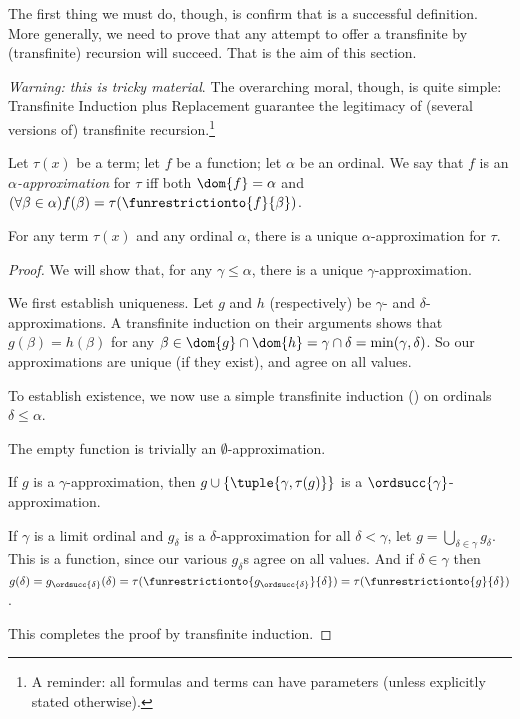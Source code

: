 \documentclass[../../../include/open-logic-section]{subfiles}
\begin{document}

The first thing we must do, though, is confirm that
 is a successful definition. More generally,
we need to prove that any attempt to offer a transfinite by
(transfinite) recursion will succeed. That is the aim of this section.

\emph{Warning: this is tricky material}. The overarching moral,
though, is quite simple: Transfinite Induction plus Replacement
guarantee the legitimacy of (several versions of) transfinite
recursion.\footnote{A reminder: all formulas and terms can have parameters (unless explicitly stated otherwise).}

\begin{defn}
	Let $\tau(x)$ be a term; let $f$ be a function; let $\alpha$ be an ordinal. We say that $f$ is an \emph{$\alpha$-approximation} for $\tau$ iff both $\dom{f} = \alpha$ and $(\forall \beta \in \alpha)f(\beta) = \tau(\funrestrictionto{f}{\beta})$.
\end{defn}

\begin{lem}
For any term $\tau(x)$ and any ordinal $\alpha$, there is a unique $\alpha$-approximation for $\tau$.
\end{lem}
\begin{proof}
We will show that, for any $\gamma \leq \alpha$, there is a unique
$\gamma$-approximation. 

We first establish uniqueness. Let $g$ and $h$ (respectively) be $\gamma$- and $\delta$-approximations. A transfinite induction on their arguments shows that
$g(\beta) = h(\beta)$ for any $\beta \in \dom{g} \cap \dom{h} =
\gamma \cap \delta = \min(\gamma, \delta)$. So our approximations are unique (if they exist), and agree on all values.

To establish existence, we now use a simple transfinite induction
() on ordinals
$\delta \leq \alpha$. 

The empty function is trivially an $\emptyset$-approximation. 

If $g$ is a $\gamma$-approximation, then $g \cup
\{\tuple{\gamma, \tau(g)}\}$ is a $\ordsucc{\gamma}$-approximation.

If $\gamma$ is a limit ordinal and $g_\delta$ is a $\delta$-approximation for all $\delta < \gamma$, let $g = \bigcup_{\delta \in \gamma} g_\delta$. This
is a function, since our various $g_\delta$s agree on all values. And
if $\delta \in \gamma$ then $g(\delta) = g_{\ordsucc{\delta}}(\delta) =
\tau(\funrestrictionto{g_{\ordsucc{\delta}}}{\delta}) =
\tau(\funrestrictionto{g}{\delta})$.

This completes the proof by transfinite induction.
\end{proof}
\end{document}
